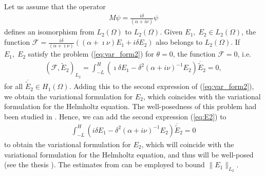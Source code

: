 \documentclass[proc]{edpsmath}
\begin{document}
\begin{remark}
Let us assume that the operator
\begin{align*}
M\psi = \frac{i\delta}{(\alpha+i\nu)}\psi
\end{align*}
defines an isomorphism from $L_{2}(\Omega)$ to $L_{2}(\Omega)$. 
Given $E_1,\; E_2\in L_{2}(\Omega)$, the function $\mathcal{F}=\frac{i\delta}{(\alpha+\imath\nu)}\left((\alpha+\imath\nu)E_{1}+i\delta E_{2}\right)$ also belongs to $L_{2}(\Omega)$. 
If $E_1,\; E_2$ satisfy the problem (\ref{eq:var_form2}) for $\theta=0$, the function $\mathcal{F}=0$, 
i.e.
\begin{align*}
 (\mathcal{F},\tilde{E}_{2})_{L_{2}}=\int_{-L}^{H}\left(\imath\delta E_{1}-\delta^2(\alpha+i\nu)^{-1} E_{2}\right)\overline{\tilde E}_{2}=0,
\end{align*}
for all $\overline{\tilde E}_2\in H_{1}(\Omega)$. Adding this to the second expression of (\ref{eq:var_form2}), we obtain 
the variational formulation for $E_2$, which coincides with the variational formulation for the Helmholtz equation. The well-posedness 
of this problem had been studied in \cite{}. 
Hence, we can add the second expression (\ref{eq:E2}) to
\begin{align*}
\int_{-L}^{H}\left(i\delta E_{1}-\delta^2(\alpha+i\nu)^{-1} E_{2}\right)\overline{\tilde E}_{2}=0
\end{align*}
to obtain the variational formulation for $E_{2}$, which will coincide with the variational formulation for the Helmholtz equation, and thus will be well-posed 
(see the thesis \cite{thesis_lmig}).
The estimates from \cite{thesis_lmig} can be employed to bound $\|E_{1}\|_{L_{2}}$.
\end{remark}
\end{document}

